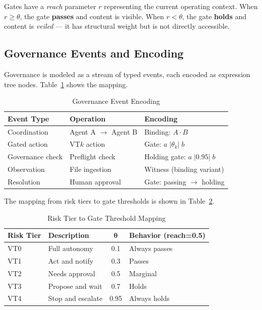 \documentclass[sigconf,nonacm]{acmart}
\begin{document}
Gates have a \emph{reach} parameter $r$ representing the current
operating context. When $r \geq \theta$, the gate \textbf{passes} and
content is visible. When $r < \theta$, the gate \textbf{holds} and
content is \emph{veiled} --- it has structural weight but is not directly
accessible.

\subsection{Governance Events and Encoding}\label{sec:encoding}

Governance is modeled as a stream of typed events, each encoded as
expression tree nodes. Table~\ref{tab:events} shows the mapping.

\begin{table}[t]
  \caption{Governance Event Encoding}\label{tab:events}
  \small
  \begin{tabular}{@{}lll@{}}
    \toprule
    \textbf{Event Type} & \textbf{Operation} & \textbf{Encoding} \\
    \midrule
    Coordination & Agent A $\to$ Agent B & Binding: $A \cdot B$ \\
    Gated action & VT$k$ action & Gate: $a\;|\theta_k|\;b$ \\
    Governance check & Preflight check & Holding gate: $a\;|0.95|\;b$ \\
    Observation & File ingestion & Witness (binding variant) \\
    Resolution & Human approval & Gate: passing $\to$ holding \\
    \bottomrule
  \end{tabular}
\end{table}

The mapping from risk tiers to gate thresholds is shown in
Table~\ref{tab:risktiers}.

\begin{table}[t]
  \caption{Risk Tier to Gate Threshold Mapping}\label{tab:risktiers}
  \small
  \begin{tabular}{@{}llcl@{}}
    \toprule
    \textbf{Risk Tier} & \textbf{Description} & $\boldsymbol{\theta}$ & \textbf{Behavior (reach=0.5)} \\
    \midrule
    VT0 & Full autonomy & 0.1 & Always passes \\
    VT1 & Act and notify & 0.3 & Passes \\
    VT2 & Needs approval & 0.5 & Marginal \\
    VT3 & Propose and wait & 0.7 & Holds \\
    VT4 & Stop and escalate & 0.95 & Always holds \\
    \bottomrule
  \end{tabular}
\end{table}
\end{document}
